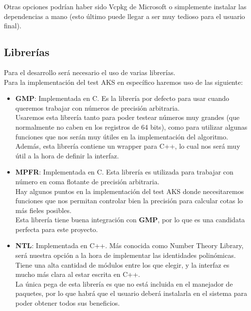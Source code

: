 Otras opciones podrían haber sido Vcpkg de Microsoft o simplemente instalar las dependencias a mano (esto último puede llegar a ser muy tedioso para el usuario final).

\subsection{Librerías}

Para el desarrollo será necesario el uso de varias librerías.\\

Para la implementación del test AKS en específico haremos uso de las siguiente:

\begin{itemize}
	\item \textbf{GMP}: Implementada en C. Es la librería por defecto para usar cuando queremos trabajar con números de precisión arbitraria.\\
	
	Usaremos esta librería tanto para poder testear números muy grandes (que normalmente no caben en los registros de 64 bits), como para utilizar algunas funciones que nos serán muy útiles en la implementación del algoritmo.\\
	
	Además, esta librería contiene un wrapper para C++, lo cual nos será muy útil a la hora de definir la interfaz.\\
	
	\item \textbf{MPFR}: Implementada en C. Esta librería es utilizada para trabajar con número en coma flotante de precisión arbitraria.\\
	
	Hay algunos puntos en la implementación del test AKS donde necesitaremos funciones que nos permitan controlar bien la precisión para calcular cotas lo más fieles posibles.\\
	
	Esta librería tiene buena integración con \textbf{GMP}, por lo que es una candidata perfecta para este proyecto.
	
	\item \textbf{NTL}: Implementada en C++. Más conocida como Number Theory Library, será nuestra opción a la hora de implementar las identidades polinómicas.\\
	
	Tiene una alta cantidad de módulos entre los que elegir, y la interfaz es mucho más clara al estar escrita en C++.\\
	
	La única pega de esta librería es que no está incluida en el manejador de paquetes, por lo que habrá que el usuario deberá instalarla en el sistema para poder obtener todos sus beneficios.
\end{itemize}

